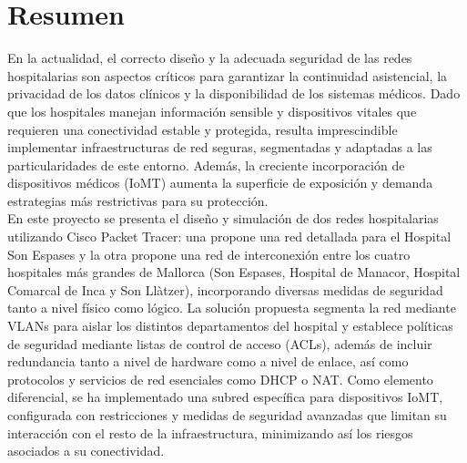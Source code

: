 
\chapter{Resumen}

En la actualidad, el correcto diseño y la adecuada seguridad de las redes hospitalarias son aspectos críticos para garantizar la continuidad asistencial, 
la privacidad de los datos clínicos y la disponibilidad de los sistemas médicos. Dado que los hospitales manejan información sensible y dispositivos 
vitales que requieren una conectividad estable y protegida, resulta imprescindible implementar infraestructuras de red seguras, segmentadas y adaptadas a las 
particularidades de este entorno. Además, la creciente incorporación de dispositivos médicos (IoMT) aumenta la superficie de exposición y demanda 
estrategias más restrictivas para su protección. \\

En este proyecto se presenta el diseño y simulación de dos redes hospitalarias utilizando Cisco Packet Tracer: una propone una red detallada para el Hospital Son Espases y la otra 
propone una red de interconexión entre los cuatro hospitales más grandes de Mallorca (Son Espases, Hospital de Manacor, Hospital Comarcal de Inca y Son Llàtzer), incorporando diversas medidas de seguridad tanto a 
nivel físico como lógico. La solución propuesta segmenta la red mediante VLANs para aislar los distintos departamentos del hospital y establece políticas de 
seguridad mediante listas de control de acceso (ACLs), además de incluir redundancia tanto a nivel de hardware como a 
nivel de enlace, así como protocolos y servicios de red esenciales como DHCP o NAT. Como elemento diferencial, se ha implementado una subred específica para dispositivos IoMT, configurada con restricciones y medidas de seguridad 
avanzadas que limitan su interacción con el resto de la infraestructura, minimizando así los riesgos asociados a su conectividad.
